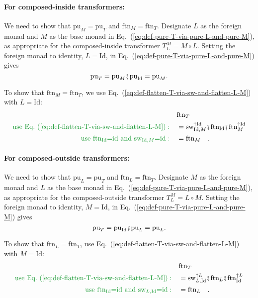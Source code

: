 \paragraph{For composed-inside transformers:}

We need to show that $\text{pu}_{M}=\text{pu}_{T}$ and $\text{ftn}_{M}=\text{ftn}_{T}$.
Designate $L$ as the foreign monad and $M$ as the base monad in
Eq.~(\ref{eq:def-pure-T-via-pure-L-and-pure-M}), as appropriate
for the composed-inside transformer $T_{L}^{M}=M\circ L$. Setting
the foreign monad to identity, $L=\text{Id}$, in Eq.~(\ref{eq:def-pure-T-via-pure-L-and-pure-M})
gives
\[
\text{pu}_{T}=\text{pu}_{M}\bef\text{pu}_{\text{Id}}=\text{pu}_{M}.
\]

To show that $\text{ftn}_{M}=\text{ftn}_{T}$, we use Eq.~(\ref{eq:def-flatten-T-via-sw-and-flatten-L-M})
with $L=\text{Id}$:
\begin{align*}
 & \text{ftn}_{T}\\
{\color{greenunder}\text{use Eq.~(\ref{eq:def-flatten-T-via-sw-and-flatten-L-M})}:}\quad & =\text{sw}_{\text{Id},M}^{\uparrow\text{Id}}\bef\text{ftn}_{\text{Id}}\bef\text{ftn}_{M}^{\uparrow\text{Id}}\\
{\color{greenunder}\text{use \ensuremath{\text{ftn}_{\text{Id}}}=\text{id} and \ensuremath{\text{sw}_{\text{Id},M}}=\text{id}}:}\quad & =\text{ftn}_{M}\quad.
\end{align*}


\paragraph{For composed-outside transformers:}

We need to show that $\text{pu}_{L}=\text{pu}_{T}$ and $\text{ftn}_{L}=\text{ftn}_{T}$.
Designate $M$ as the foreign monad and $L$ as the base monad in
Eq.~(\ref{eq:def-pure-T-via-pure-L-and-pure-M}), as appropriate
for the composed-outside transformer $T_{L}^{M}=L\circ M$. Setting
the foreign monad to identity, $M=\text{Id}$, in Eq.~(\ref{eq:def-pure-T-via-pure-L-and-pure-M})
gives
\[
\text{pu}_{T}=\text{pu}_{\text{Id}}\bef\text{pu}_{L}=\text{pu}_{L}.
\]

To show that $\text{ftn}_{L}=\text{ftn}_{T}$, use Eq.~(\ref{eq:def-flatten-T-via-sw-and-flatten-L-M})
with $M=\text{Id}$:
\begin{align*}
 & \text{ftn}_{T}\\
{\color{greenunder}\text{use Eq.~(\ref{eq:def-flatten-T-via-sw-and-flatten-L-M})}:}\quad & =\text{sw}_{L,\text{Id}}^{\uparrow L}\bef\text{ftn}_{L}\bef\text{ftn}_{\text{Id}}^{\uparrow L}\\
{\color{greenunder}\text{use \ensuremath{\text{ftn}_{\text{Id}}}=\text{id} and \ensuremath{\text{sw}_{L,\text{Id}}}=\text{id}}:}\quad & =\text{ftn}_{L}\quad.
\end{align*}


